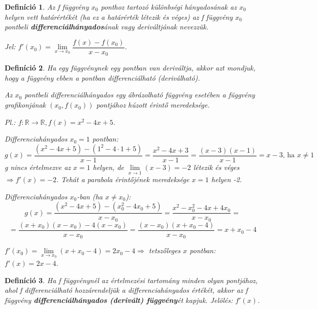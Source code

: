 \documentclass[12pt,a4paper]{article}
\newtheorem{definition}{Definíció} [section]
\begin{document}
\begin{definition}
Az f függvény $x_0$ ponthoz tartozó különbségi hányadosának az $x_0$ helyen vett határértékét (ha ez a határérték létezik és véges) az f függvény $x_0$ pontbeli \textbf{differenciálhányados}ának vagy deriváltjának nevezzük.

Jel: $f'(x_0)=\lim\limits_{x\to x_0}\dfrac{f(x)-f(x_0)}{x-x_0}$.
\end{definition}
\newpage
\begin{definition}
Ha egy függvénynek egy pontban van deriváltja, akkor azt mondjuk, hogy a függvény ebben a pontban differenciálható (deriválható).

Az $x_0$ pontbeli differenciálhányados egy ábrázolható függvény esetében a függvény grafikonjának $(x_0, f(x_0))$ pontjához húzott érintő meredeksége.

Pl.: $f: \mathbb{R}\to \mathbb{R}, f(x)=x^2-4x+5$.

Differenciahányados $x_0 = 1$ pontban:
$$g(x)=\dfrac{(x^2-4x+5)-(1^2-4\cdot 1+5)}{x-1}=\dfrac{x^2-4x+3}{x-1}=\dfrac{(x-3)(x-1)}{x-1}=x-3\text{, ha }x\neq 1$$
g nincs értelmezve az $x = 1$ helyen, de $\lim\limits_{x\to 1}(x-3)=-2$ létezik és véges $\Rightarrow f'(x)=-2$. Tehát a parabola érintőjének meredeksége $x=1$ helyen -2.

Differenciahányados $x_0$-ban (ha $x\neq x_0$):
$$g(x)=\dfrac{(x^2-4x+5)-(x_0^2-4x_0+5)}{x-x_0}=\dfrac{x^2-x_0^2-4x+4x_0}{x-x_0}=$$
$$=\dfrac{(x+x_0)(x-x_0)-4(x-x_0)}{x-x_0}=\dfrac{(x-x_0)(x+x_0-4)}{x-x_0}=x+x_0-4$$

$f'(x_0)=\lim\limits_{x\to x_0}(x+x_0-4)=2x_0-4\Rightarrow$ tetszőleges $x$ pontban: $f'(x)=2x-4$.
\end{definition}

\begin{definition}
Ha f függvénynél az értelmezési tartomány minden olyan pontjához, ahol f differenciálható hozzárendeljük a differenciahányados értékét, akkor az f függvény \textbf{differenciálhányados (derivált) függvény}ét kapjuk. Jelölés: $f'(x)$.
\end{definition}
\end{document}
